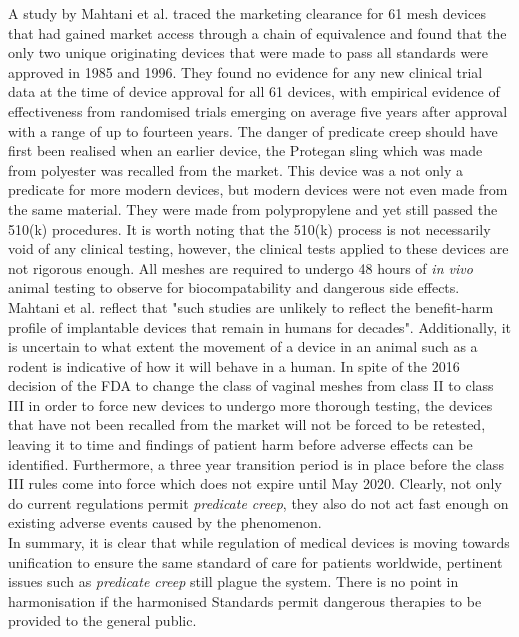 \documentclass[12pt, openany, oneside]{book}
\begin{document}
A study by Mahtani et al. \citep{heneghan2017transvaginal} traced the marketing clearance for 61 mesh devices that had gained market access through a chain of equivalence and found that the only two unique originating devices that were made to pass all standards were approved in 1985 and 1996. They found no evidence for any new clinical trial data at the time of device approval for all 61 devices, with empirical evidence of effectiveness from randomised trials emerging on average five years after approval with a range of up to fourteen years. The danger of predicate creep should have first been realised when an earlier device, the Protegan sling which was made from polyester was recalled from the market. This device was a not only a predicate for more modern devices, but modern devices were not even made from the same material. They were made from polypropylene and yet still passed the 510(k) procedures. It is worth noting that the 510(k) process is not necessarily void of any clinical testing, however, the clinical tests applied to these devices are not rigorous enough. All meshes are required to undergo 48 hours of \textit{in vivo} animal testing to observe for biocompatability and dangerous side effects. Mahtani et al. reflect that "such studies are unlikely to reflect the benefit-harm profile of implantable devices that remain in humans for decades". Additionally, it is uncertain to what extent the movement of a device in an animal such as a rodent is indicative of how it will behave in a human. In spite of the 2016 decision of the FDA to change the class of vaginal meshes from class II to class III in order to force new devices to undergo more thorough testing, the devices that have not been recalled from the market will not be forced to be retested, leaving it to time and findings of patient harm before adverse effects can be identified. Furthermore, a three year transition period is in place before the class III rules come into force which does not expire until May 2020. Clearly, not only do current regulations permit \textit{predicate creep}, they also do not act fast enough on existing adverse events caused by the phenomenon.\\

In summary, it is clear that while regulation of medical devices is moving towards unification to ensure the same standard of care for patients worldwide, pertinent issues such as \textit{predicate creep} still plague the system. There is no point in harmonisation if the harmonised Standards permit dangerous therapies to be provided to the general public.
\end{document}
